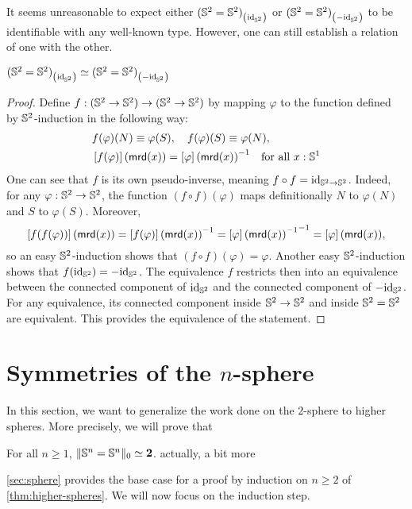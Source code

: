 \documentclass[english,a4]{article}
\renewcommand{\ap}[1]{\left[{#1}\right]}
\newcommand{\setTrunc}[1]{\Trunc{#1}_0}
\begin{document}
It seems unreasonable to expect either ${({{\mathbb S^{2}}} = {{\mathbb S^{2}}})}_{\left(\mathord{\mathrm{id}}_{{\mathbb S^{2}}}\right)}$ or
${({{\mathbb S^{2}}} = {{\mathbb S^{2}}})}_{\left(-\mathord{\mathrm{id}}_{{\mathbb S^{2}}}\right)}$ to be identifiable with any well-known type.
However, one can still establish a relation of one with the other.
\begin{proposition}
  ${({{\mathbb S^{2}}} = {{\mathbb S^{2}}})}_{\left(\mathord{\mathrm{id}}_{{\mathbb S^{2}}}\right)} \simeq {({{\mathbb S^{2}}}= {{\mathbb S^{2}}})}_{\left(-\mathord{\mathrm{id}}_{{\mathbb S^{2}}}\right)}$
  \label{prop:S2-components-are-equiv}
\end{proposition}
\begin{proof}
  Define $f:{({{\mathbb S^{2}}} \to {{\mathbb S^{2}}})} \to ({{\mathbb S^{2}}} \to {{\mathbb S^{2}}})$ by mapping
  $\varphi$ to the function defined by ${{\mathbb S^{2}}}$-induction in the following way:
  \begin{align*}
    &f(\varphi)(N) \jdeq \varphi(S), \quad f(\varphi)(S) \jdeq \varphi(N),\\
    &\ap{f(\varphi)}(\mrd(x)) = \inv{\ap{\varphi}(\mrd(x))}\quad \text{for all}\ x:\Sc
  \end{align*}
  One can see that $f$ is its own pseudo-inverse, meaning $f\circ f = \mathord{\mathrm{id}}_{{{\mathbb S^{2}}}
  \to {{\mathbb S^{2}}}}$. Indeed, for any $\varphi:{{\mathbb S^{2}}} \to {{\mathbb S^{2}}}$, the function $(f\circ
  f)(\varphi)$ maps definitionally $N$ to $\varphi(N)$ and $S$ to $\varphi(S)$.
  Moreover, 
  \[
  \ap{f(f(\varphi))}(\mrd(x)) = \inv{\ap{f(\varphi)}(\mrd(x))}
  = \inv{\inv{\ap{\varphi}(\mrd(x))}} = \ap{\varphi}(\mrd(x)),
  \]
  so an easy ${{\mathbb S^{2}}}$-induction shows that $(f\circ f)(\varphi) = \varphi$.
  Another easy ${{\mathbb S^{2}}}$-induction shows that $f(\mathord{\mathrm{id}}_{{\mathbb S^{2}}}) = -\mathord{\mathrm{id}}_{{\mathbb S^{2}}}$.
  The equivalence $f$ restricts then into an equivalence between the connected
  component of $\mathord{\mathrm{id}}_{{\mathbb S^{2}}}$ and the connected component of $-\mathord{\mathrm{id}}_{{\mathbb S^{2}}}$. 
  For any equivalence, its connected
  component inside ${{\mathbb S^{2}}}\to{{\mathbb S^{2}}}$ and inside ${{\mathbb S^{2}}}={{\mathbb S^{2}}}$ are equivalent.
  This provides the equivalence of the statement.
\end{proof}

\section{Symmetries of the $n$-sphere}
\label{sec:higher-sphere}

In this section, we want to generalize the work done on the $2$-sphere to higher
spheres. More precisely, we will prove that
\begin{theorem}
  \label{thm:higher-spheres}
  For all $n\geq 1$, $\setTrunc{\Sn n = \Sn n} \weq \bn 2$.
{\color{red} actually, a bit more}
\end{theorem}
%

\cref{sec:sphere} provides the base case for a proof by induction on $n \geq 2$
of \cref{thm:higher-spheres}. We will now focus on the induction step. 
\end{document}
